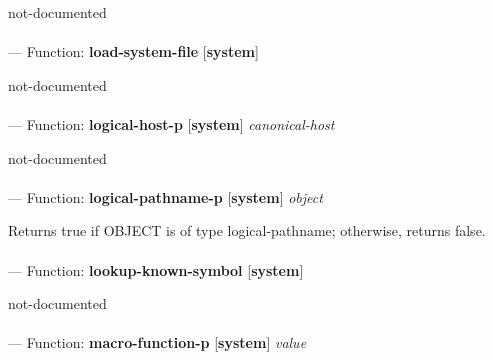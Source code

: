 \begin{adjustwidth}{5em}{5em}
not-documented
\end{adjustwidth}

\paragraph{}
\label{SYSTEM:LOAD-SYSTEM-FILE}
--- Function: \textbf{load-system-file} [\textbf{system}] \textit{}

\begin{adjustwidth}{5em}{5em}
not-documented
\end{adjustwidth}

\paragraph{}
\label{SYSTEM:LOGICAL-HOST-P}
--- Function: \textbf{logical-host-p} [\textbf{system}] \textit{canonical-host}

\begin{adjustwidth}{5em}{5em}
not-documented
\end{adjustwidth}

\paragraph{}
\label{SYSTEM:LOGICAL-PATHNAME-P}
--- Function: \textbf{logical-pathname-p} [\textbf{system}] \textit{object}

\begin{adjustwidth}{5em}{5em}
Returns true if OBJECT is of type logical-pathname; otherwise, returns false.
\end{adjustwidth}

\paragraph{}
\label{SYSTEM:LOOKUP-KNOWN-SYMBOL}
--- Function: \textbf{lookup-known-symbol} [\textbf{system}] \textit{}

\begin{adjustwidth}{5em}{5em}
not-documented
\end{adjustwidth}

\paragraph{}
\label{SYSTEM:MACRO-FUNCTION-P}
--- Function: \textbf{macro-function-p} [\textbf{system}] \textit{value}

